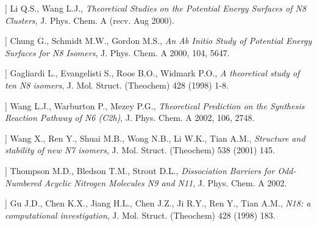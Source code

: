 \begin{description}[leftmargin=1.6cm,itemsep=3pt,style=nextline]
\item[[A13]] Li Q.S., Wang L.J., \emph{Theoretical Studies on the Potential Energy Surfaces of N8 Clusters}, J. Phys. Chem. A (recv. Aug 2000).
\item[[A14]] Chung G., Schmidt M.W., Gordon M.S., \emph{An Ab Initio Study of Potential Energy Surfaces for N8 Isomers}, J. Phys. Chem. A 2000, 104, 5647.
\item[[A15]] Gagliardi L., Evangelisti S., Roos B.O., Widmark P.O., \emph{A theoretical study of ten N8 isomers}, J. Mol. Struct. (Theochem) 428 (1998) 1-8.
\item[[A16]] Wang L.J., Warburton P., Mezey P.G., \emph{Theoretical Prediction on the Synthesis Reaction Pathway of N6 (C2h)}, J. Phys. Chem. A 2002, 106, 2748.
\item[[A17]] Wang X., Ren Y., Shuai M.B., Wong N.B., Li W.K., Tian A.M., \emph{Structure and stability of new N7 isomers}, J. Mol. Struct. (Theochem) 538 (2001) 145.
\item[[A18]] Thompson M.D., Bledson T.M., Strout D.L., \emph{Dissociation Barriers for Odd-Numbered Acyclic Nitrogen Molecules N9 and N11}, J. Phys. Chem. A 2002.
\item[[A19]] Gu J.D., Chen K.X., Jiang H.L., Chen J.Z., Ji R.Y., Ren Y., Tian A.M., \emph{N18: a computational investigation}, J. Mol. Struct. (Theochem) 428 (1998) 183.
\end{description}
